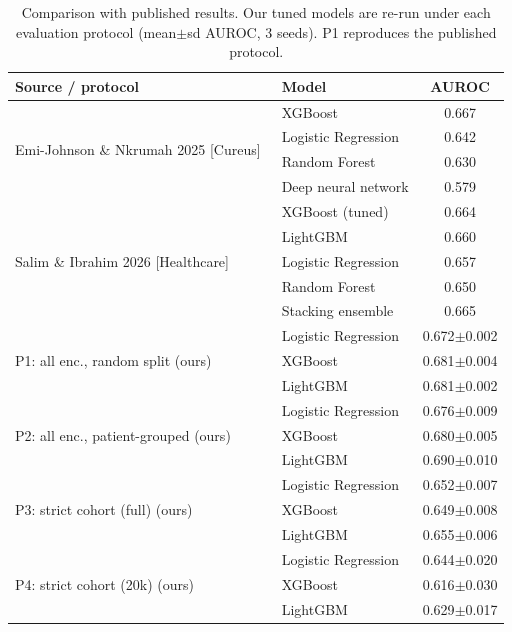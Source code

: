 \begin{table}[t]\centering\caption{Comparison with published results. Our tuned models are re-run under each evaluation protocol (mean$\pm$sd AUROC, 3 seeds). P1 reproduces the published protocol.}\label{tab:bench}\footnotesize\setlength{\tabcolsep}{3pt}
\begin{tabular}{llc}\toprule Source / protocol & Model & AUROC \\\midrule
\multirow{4}{*}{\parbox{2.6cm}{Emi-Johnson \& Nkrumah 2025 [Cureus]~\cite{emijohnson2025}}} & XGBoost & 0.667 \\
 & Logistic Regression & 0.642 \\
 & Random Forest & 0.630 \\
 & Deep neural network & 0.579 \\
\midrule
\multirow{5}{*}{\parbox{2.6cm}{Salim \& Ibrahim 2026 [Healthcare]~\cite{salim2026}}} & XGBoost (tuned) & 0.664 \\
 & LightGBM & 0.660 \\
 & Logistic Regression & 0.657 \\
 & Random Forest & 0.650 \\
 & Stacking ensemble & 0.665 \\
\midrule
\multirow{3}{*}{\parbox{2.6cm}{P1: all enc., random split (ours)}} & Logistic Regression & 0.672$\pm$0.002 \\
 & XGBoost & 0.681$\pm$0.004 \\
 & LightGBM & 0.681$\pm$0.002 \\
\midrule
\multirow{3}{*}{\parbox{2.6cm}{P2: all enc., patient-grouped (ours)}} & Logistic Regression & 0.676$\pm$0.009 \\
 & XGBoost & 0.680$\pm$0.005 \\
 & LightGBM & 0.690$\pm$0.010 \\
\midrule
\multirow{3}{*}{\parbox{2.6cm}{P3: strict cohort (full) (ours)}} & Logistic Regression & 0.652$\pm$0.007 \\
 & XGBoost & 0.649$\pm$0.008 \\
 & LightGBM & 0.655$\pm$0.006 \\
\midrule
\multirow{3}{*}{\parbox{2.6cm}{P4: strict cohort (20k) (ours)}} & Logistic Regression & 0.644$\pm$0.020 \\
 & XGBoost & 0.616$\pm$0.030 \\
 & LightGBM & 0.629$\pm$0.017 \\
\bottomrule\end{tabular}\end{table}
